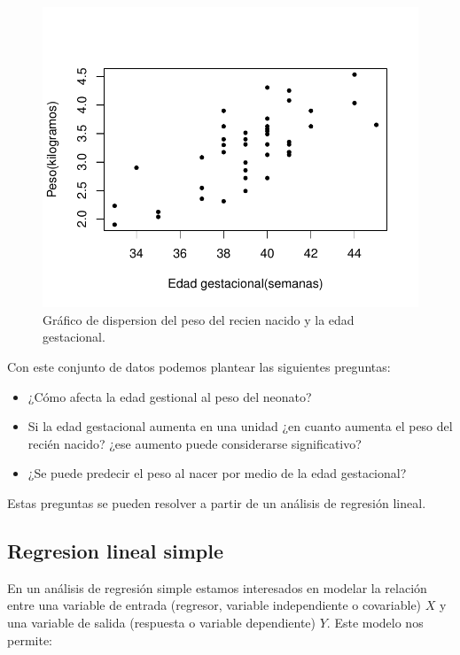\documentclass[
]{article}
\providecommand{\tightlist}{%
  \setlength{\itemsep}{0pt}\setlength{\parskip}{0pt}}
\begin{document}
\begin{figure}

{\centering \includegraphics{MLG1_files/figure-latex/birthweightFigure-1} 

}

\caption{Gráfico de dispersion del peso del recien nacido y la edad gestacional.}\label{fig:birthweightFigure}
\end{figure}

Con este conjunto de datos podemos plantear las siguientes preguntas:

\begin{itemize}
\tightlist
\item
  ¿Cómo afecta la edad gestional al peso del neonato?
\item
  Si la edad gestacional aumenta en una unidad ¿en cuanto aumenta el peso del recién nacido? ¿ese aumento puede considerarse significativo?
\item
  ¿Se puede predecir el peso al nacer por medio de la edad gestacional?
\end{itemize}

Estas preguntas se pueden resolver a partir de un análisis de regresión lineal.

\hypertarget{regresion-lineal-simple}{%
\subsection{Regresion lineal simple}\label{regresion-lineal-simple}}

En un análisis de regresión simple estamos interesados en modelar la relación entre una variable de entrada (regresor, variable independiente o covariable) \(X\) y una variable de salida (respuesta o variable dependiente) \(Y\). Este modelo nos permite:
\end{document}
